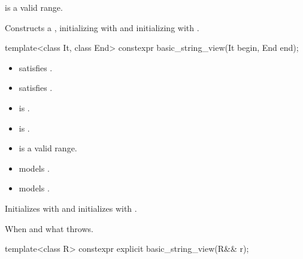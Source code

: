 \begin{itemdescr}
\pnum
\expects
{} is a valid range.

\pnum
\effects
Constructs a , initializing  with 
and initializing  with .
\end{itemdescr}

%
\begin{itemdecl}
template<class It, class End>
  constexpr basic_string_view(It begin, End end);
\end{itemdecl}

\begin{itemdescr}
\pnum
\constraints
\begin{itemize}
\item {} satisfies .
\item {} satisfies .
\item {} is .
\item {} is .
\end{itemize}

\pnum
\expects
\begin{itemize}
\item {} is a valid range.
\item {} models .
\item {} models .
\end{itemize}

\pnum
\effects
Initializes  with  and
initializes  with .

\pnum
\throws
When and what  throws.
\end{itemdescr}

%
\begin{itemdecl}
template<class R>
  constexpr explicit basic_string_view(R&& r);
\end{itemdecl}

